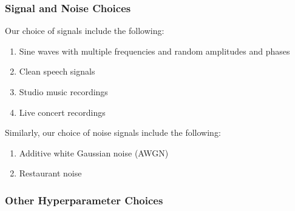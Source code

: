 \subsubsection{Signal and Noise Choices}
Our choice of signals include the following:

\begin{enumerate}
    \item Sine waves with multiple frequencies and random amplitudes and phases
    \item Clean speech signals
    \item Studio music recordings
    \item Live concert recordings
\end{enumerate}

Similarly, our choice of noise signals include the following:

\begin{enumerate}
    \item Additive white Gaussian noise (AWGN)
    \item Restaurant noise
\end{enumerate}

\subsubsection{Other Hyperparameter Choices}
